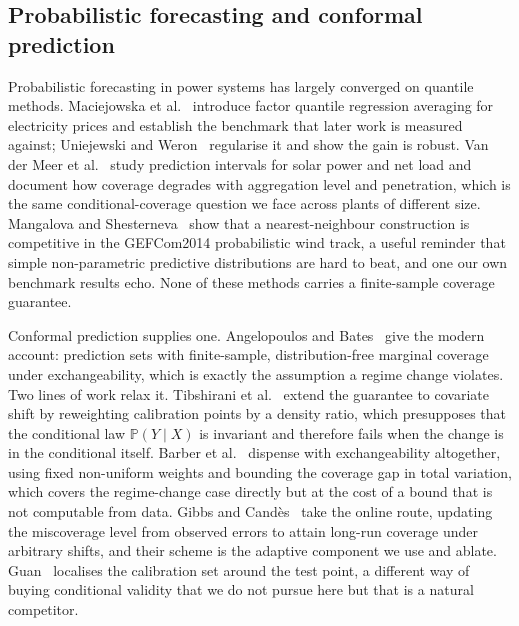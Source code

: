 \documentclass[preprint,3p,times]{elsarticle}
\begin{document}
\subsection{Probabilistic forecasting and conformal prediction}

Probabilistic forecasting in power systems has largely converged on quantile methods. Maciejowska et al.~\cite{maciejowska2016} introduce factor quantile regression averaging for electricity prices and establish the benchmark that later work is measured against; Uniejewski and Weron~\cite{uniejewski2021} regularise it and show the gain is robust. Van der Meer et al.~\cite{vandermeer2018} study prediction intervals for solar power and net load and document how coverage degrades with aggregation level and penetration, which is the same conditional-coverage question we face across plants of different size. Mangalova and Shesterneva~\cite{mangalova2016} show that a nearest-neighbour construction is competitive in the GEFCom2014 probabilistic wind track, a useful reminder that simple non-parametric predictive distributions are hard to beat, and one our own benchmark results echo. None of these methods carries a finite-sample coverage guarantee.

Conformal prediction supplies one. Angelopoulos and Bates~\cite{angelopoulos2023} give the modern account: prediction sets with finite-sample, distribution-free marginal coverage under exchangeability, which is exactly the assumption a regime change violates. Two lines of work relax it. Tibshirani et al.~\cite{tibshirani2019} extend the guarantee to covariate shift by reweighting calibration points by a density ratio, which presupposes that the conditional law $\mathbb{P}(Y\mid X)$ is invariant and therefore fails when the change is in the conditional itself. Barber et al.~\cite{barber2023} dispense with exchangeability altogether, using fixed non-uniform weights and bounding the coverage gap in total variation, which covers the regime-change case directly but at the cost of a bound that is not computable from data. Gibbs and Cand\`es~\cite{gibbs2021} take the online route, updating the miscoverage level from observed errors to attain long-run coverage under arbitrary shifts, and their scheme is the adaptive component we use and ablate. Guan~\cite{guan2022} localises the calibration set around the test point, a different way of buying conditional validity that we do not pursue here but that is a natural competitor.
\end{document}
